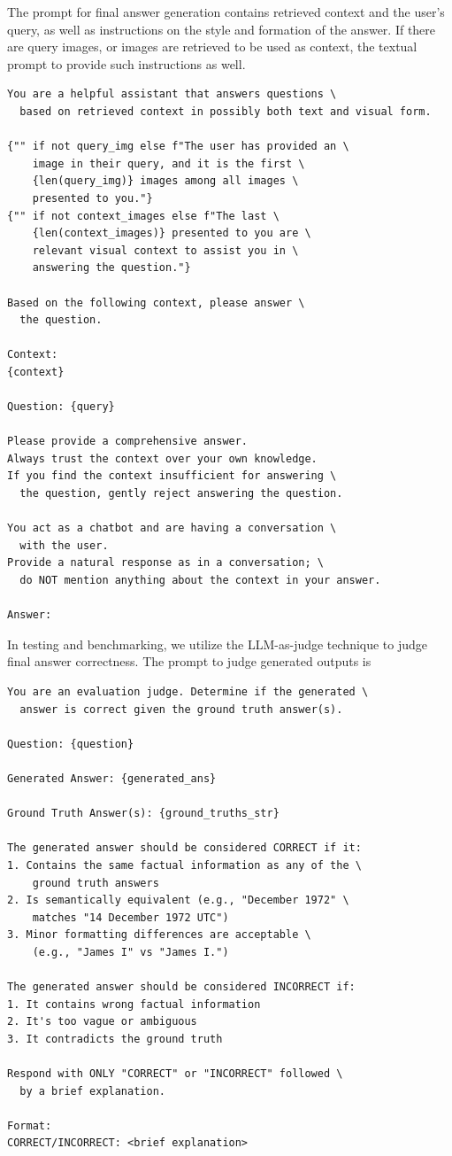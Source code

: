 The prompt for final answer generation contains retrieved context and the user's query,
as well as instructions on the style and formation of the answer.
If there are query images, or images are retrieved to be used as context,
the textual prompt to provide such instructions as well.
\begin{verbatim}
You are a helpful assistant that answers questions \
  based on retrieved context in possibly both text and visual form.

{"" if not query_img else f"The user has provided an \
    image in their query, and it is the first \
    {len(query_img)} images among all images \
    presented to you."}
{"" if not context_images else f"The last \
    {len(context_images)} presented to you are \
    relevant visual context to assist you in \
    answering the question."}   

Based on the following context, please answer \
  the question.

Context:
{context}

Question: {query}

Please provide a comprehensive answer.
Always trust the context over your own knowledge.
If you find the context insufficient for answering \
  the question, gently reject answering the question.

You act as a chatbot and are having a conversation \
  with the user.
Provide a natural response as in a conversation; \
  do NOT mention anything about the context in your answer.

Answer:
\end{verbatim}

In testing and benchmarking, we utilize the LLM-as-judge technique \cite{gu2025surveyllmasajudge} to judge final answer correctness.
The prompt to judge generated outputs is
\begin{verbatim}
You are an evaluation judge. Determine if the generated \
  answer is correct given the ground truth answer(s).

Question: {question}

Generated Answer: {generated_ans}

Ground Truth Answer(s): {ground_truths_str}

The generated answer should be considered CORRECT if it:
1. Contains the same factual information as any of the \
    ground truth answers
2. Is semantically equivalent (e.g., "December 1972" \
    matches "14 December 1972 UTC")
3. Minor formatting differences are acceptable \
    (e.g., "James I" vs "James I.")

The generated answer should be considered INCORRECT if:
1. It contains wrong factual information
2. It's too vague or ambiguous
3. It contradicts the ground truth

Respond with ONLY "CORRECT" or "INCORRECT" followed \
  by a brief explanation.

Format:
CORRECT/INCORRECT: <brief explanation>
\end{verbatim}
